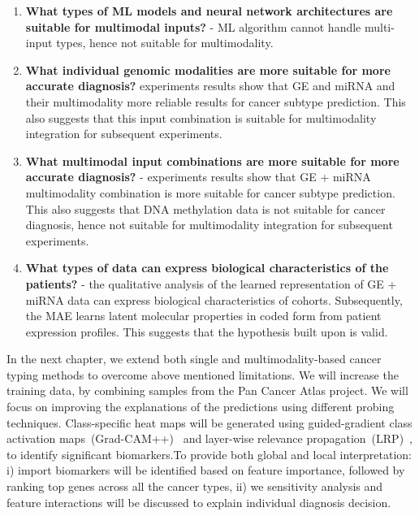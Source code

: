 \begin{enumerate}[noitemsep]
    \item \textbf{What types of ML models and neural network architectures are suitable for multimodal inputs?} - ML algorithm cannot handle multi-input types, hence not suitable for multimodality. 
    \item \textbf{What individual genomic modalities are more suitable for more accurate diagnosis?} experiments results show that GE and miRNA and their multimodality more reliable results for cancer subtype prediction. This also suggests that this input combination is suitable for multimodality integration for subsequent experiments. 
    \item \textbf{What multimodal input combinations are more suitable for more accurate diagnosis?} - experiments results show that GE + miRNA multimodality combination is more suitable for cancer subtype prediction. This also suggests that DNA methylation data is not suitable for cancer diagnosis, hence not suitable for multimodality integration for subsequent experiments.
    \item \textbf{What types of data can express biological characteristics of the patients?} - the qualitative analysis of the learned representation of GE + miRNA data can express biological characteristics of cohorts. Subsequently, the MAE learns latent molecular properties in coded form from patient expression profiles. This suggests that the hypothesis built upon is valid. 
\end{enumerate}

\hspace*{3.5mm} In the next chapter, we extend both single and multimodality-based cancer typing methods to overcome above mentioned limitations. We will increase the training data, by combining samples from the Pan Cancer Atlas project. We will focus on improving the explanations of the predictions using different probing techniques.
Class-specific heat maps will be generated using guided-gradient class activation maps~(Grad-CAM++)~\cite{chattopadhay2018grad} and layer-wise relevance propagation~(LRP)~\cite{LRP3}, to identify significant biomarkers.To provide both global and local interpretation: i) import biomarkers will be identified based on feature importance, followed by ranking top genes across all the cancer types, ii) we sensitivity analysis and feature interactions will be discussed to explain individual diagnosis decision. 
